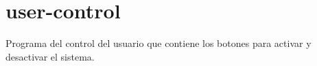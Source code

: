 \chapter{user-\/control}
\hypertarget{md__r_e_a_d_m_e}{}\label{md__r_e_a_d_m_e}
\label{md__r_e_a_d_m_e_autotoc_md0}%
%
 Programa del control del usuario que contiene los botones para activar y desactivar el sistema. 